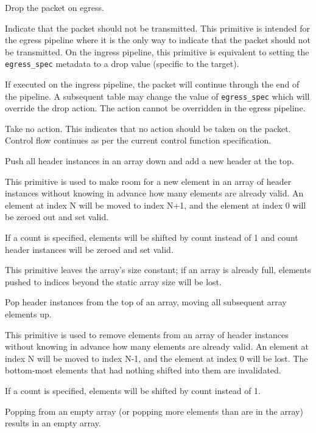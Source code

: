 \documentclass[12pt]{article}
\begin{document}

{ %
Drop the packet on egress.
}
{ %
}
{ %
Indicate that the packet should not be transmitted. This primitive is intended 
for the egress pipeline where it is the only way to indicate that the packet 
should not be transmitted. On the ingress pipeline, this primitive is equivalent 
to setting the \texttt{egress_spec} metadata to a drop value (specific to the target). 


If executed on the ingress pipeline, the packet will continue through the 
end of the pipeline. A subsequent table may change the value of \texttt{egress_spec} which 
will override the drop action. The action cannot be overridden in the egress 
pipeline.
}


{ %
Take no action.
}
{ %
}
{ %
This indicates that no action should be taken on the packet. Control flow 
continues as per the current control function specification. 
}


{ %
Push all header instances in an array down and add a new header at the top.
}
{ %
}
{ %
This primitive is used to make room for a new element in an array of header
instances without knowing in advance how many elements are already valid. An
element at index N will be moved to index N+1, and the element at index 0 will
be zeroed out and set valid.


If a count is specified, elements will be shifted by count instead of 1 and
count header instances will be zeroed and set valid.


This primitive leaves the array's size constant; if an array is already full,
elements pushed to indices beyond the static array size will be lost.
}


{ %
Pop header instances from the top of an array, moving all subsequent array elements up.
}
{ %
}
{ %
This primitive is used to remove elements from an array of header instances
without knowing in advance how many elements are already valid. An element at
index N will be moved to index N-1, and the element at index 0 will be lost. The
bottom-most elements that had nothing shifted into them are invalidated.


If a count is specified, elements will be shifted by count instead of 1.


Popping from an empty array (or popping more elements than are in the array)
results in an empty array.
}
\end{document}
